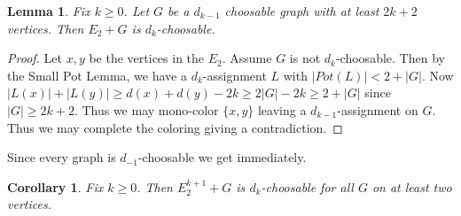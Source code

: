 \documentclass[12pt]{article}
\theoremstyle{plain}
\newtheorem{lem}[thm]{Lemma}
\newtheorem{cor}[thm]{Corollary}
\theoremstyle{definition}
\theoremstyle{remark}
\begin{document}
\begin{lem}\label{E2bringsdown}
Fix $k \geq 0$.  Let $G$ be a $d_{k - 1}$ choosable graph with at least $2k + 2$ vertices. Then $E_2 + G$ is $d_k$-choosable.
\end{lem}
\begin{proof}
 Let $x,y$ be the vertices in the $E_2$.  Assume $G$ is not $d_k$-choosable.  Then by the Small Pot Lemma,
we have a $d_k$-assignment $L$ with $|Pot(L)| < 2 + |G|$. 
Now $|L(x)| + |L(y)| \geq d(x) + d(y) - 2k \geq 2|G| - 2k \geq 2 + |G|$ since $|G| \geq 2k+2$.  Thus we may mono-color
$\{x,y\}$ leaving a $d_{k-1}$-assignment on $G$.  Thus we may complete the coloring giving a contradiction.
\end{proof}

Since every graph is $d_{-1}$-choosable we get immediately.
\begin{cor}
Fix $k \geq 0$. Then $E_2^{k+1} + G$ is $d_k$-choosable for all $G$ on at least two vertices.
\end{cor}
\end{document}
